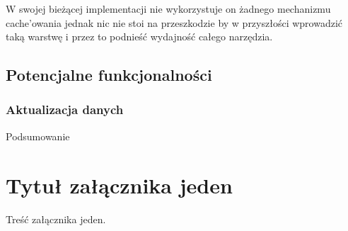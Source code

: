 \documentclass[brudnopis]{xmgr}
\begin{document}
W swojej bieżącej implementacji nie wykorzystuje on żadnego mechanizmu cache'owania jednak nic nie stoi na przeszkodzie by w przyszłości wprowadzić taką warstwę i przez to podnieść wydajność całego narzędzia.

\section{Potencjalne funkcjonalności}

\subsection{Aktualizacja danych}

\summary
Podsumowanie

\appendix
\chapter{Tytuł załącznika jeden}

Treść załącznika jeden.




\listoftables

\listoffigures

\oswiadczenie
\end{document}
